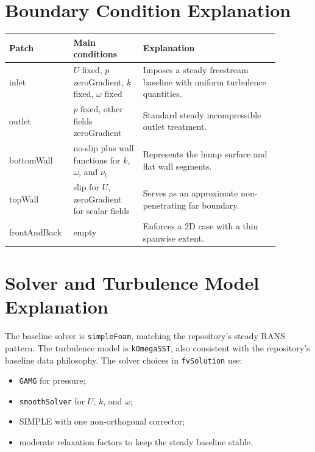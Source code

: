 \documentclass[11pt]{article}
\begin{document}
\section{Boundary Condition Explanation}
\begin{table}[H]
\centering
\begin{tabular}{p{0.17\linewidth} p{0.24\linewidth} p{0.47\linewidth}}
\toprule
Patch & Main conditions & Explanation \\
\midrule
inlet & \(U\) fixed, \(p\) zeroGradient, \(k\) fixed, \(\omega\) fixed & Imposes a steady freestream baseline with uniform turbulence quantities. \\
outlet & \(p\) fixed, other fields zeroGradient & Standard steady incompressible outlet treatment. \\
bottomWall & no-slip plus wall functions for \(k\), \(\omega\), and \(\nu_t\) & Represents the hump surface and flat wall segments. \\
topWall & slip for \(U\), zeroGradient for scalar fields & Serves as an approximate non-penetrating far boundary. \\
frontAndBack & empty & Enforces a 2D case with a thin spanwise extent. \\
\bottomrule
\end{tabular}
\end{table}

\section{Solver and Turbulence Model Explanation}
The baseline solver is \texttt{simpleFoam}, matching the repository's steady RANS pattern. The turbulence model is \texttt{kOmegaSST}, also consistent with the repository's baseline data philosophy. The solver choices in \texttt{fvSolution} use:
\begin{itemize}
\item \texttt{GAMG} for pressure;
\item \texttt{smoothSolver} for \(U\), \(k\), and \(\omega\);
\item SIMPLE with one non-orthogonal corrector;
\item moderate relaxation factors to keep the steady baseline stable.
\end{itemize}
\end{document}
